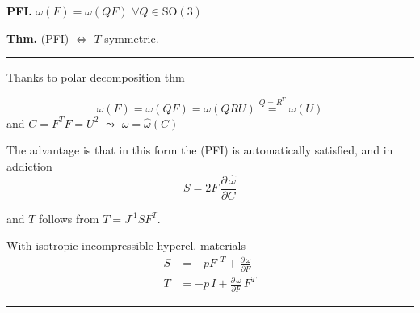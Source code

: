 \newcolumn

\textbf{PFI.} $\omega(F)=\omega(QF)$ $\forall Q\in\text{SO}(3)$

\smallskip

\textbf{Thm.} (PFI) $\Longleftrightarrow$ $T$ symmetric.

\rule{0.31\textwidth}{0.2pt}
\smallskip

Thanks to polar decomposition thm
\vspace{-1em}

\begin{equation*}
\omega(F)=\omega(QF)=\omega(QRU)\overset{Q=R^T}{=}\omega(U)
\end{equation*}
and $C=F^TF=U^2$ $\leadsto$ $\boxed{\omega=\hat{\omega}(C)}$

\smallskip

The advantage is that in this form the (PFI) is automatically satisfied, and in addiction
\begin{equation*}
\boxed{S=2F\,\textstyle\frac{\partial\,\hat{\omega}}{\partial C}}
\end{equation*}

and $T$ follows from $T=J^{\text{-}1}SF^T$.

\smallskip

With isotropic incompressible hyperel. materials
\begin{align*}
S&=-pF^{\,\text{-}T}+\textstyle\frac{\partial\,\omega}{\partial F} \\  
T&=-p\,I+\textstyle\frac{\partial\,\omega}{\partial F}\,F^T
\end{align*}


\rule{0.31\textwidth}{1pt}














